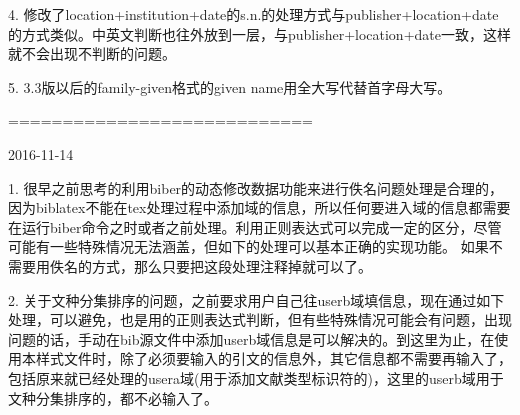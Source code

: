 4. 修改了location+institution+date的s.n.的处理方式与publisher+location+date的方式类似。中英文判断也往外放到一层，与publisher+location+date一致，这样就不会出现不判断的问题。

5. 3.3版以后的family-given格式的given name用全大写代替首字母大写。



============================

2016-11-14

1. 很早之前思考的利用biber的动态修改数据功能来进行佚名问题处理是合理的，因为biblatex不能在tex处理过程中添加域的信息，所以任何要进入域的信息都需要在运行biber命令之时或者之前处理。利用正则表达式可以完成一定的区分，尽管可能有一些特殊情况无法涵盖，但如下的处理可以基本正确的实现功能。
如果不需要用佚名的方式，那么只要把这段处理注释掉就可以了。

\begin{texlist}
\map{%
    \step[fieldset=author, fieldvalue={佚名}]
    }
\map[overwrite]{%
    \step[fieldsource=title,match=\regexp{[a-zA-Z]},final]
    \step[fieldsource=author,match=\regexp{佚名}, replace={NOAUTHOR}]
    }
\end{texlist}

2. 关于文种分集排序的问题，之前要求用户自己往userb域填信息，现在通过如下处理，可以避免，也是用的正则表达式判断，但有些特殊情况可能会有问题，出现问题的话，手动在bib源文件中添加userb域信息是可以解决的。到这里为止，在使用本样式文件时，除了必须要输入的引文的信息外，其它信息都不需要再输入了，包括原来就已经处理的usera域(用于添加文献类型标识符的)，这里的userb域用于文种分集排序的，都不必输入了。

\begin{texlist}
\map{%
     \step[fieldsource=entrykey]
     \step[fieldset=keywords, origfieldval]
     \step[fieldsource=note,final]%
     \step[fieldset=keywords, fieldvalue={,},append]
     \step[fieldset=keywords, origfieldval,append]
     }
\map{%
     \step[fieldsource=author,match=\regexp{[^a-zA-Z\s\.\,\'\{\}]},final]
     \step[fieldset=userb,fieldvalue={cn}]
     }
\map{%
     \step[fieldset=userb,fieldvalue={en}]
     }
\end{texlist}


